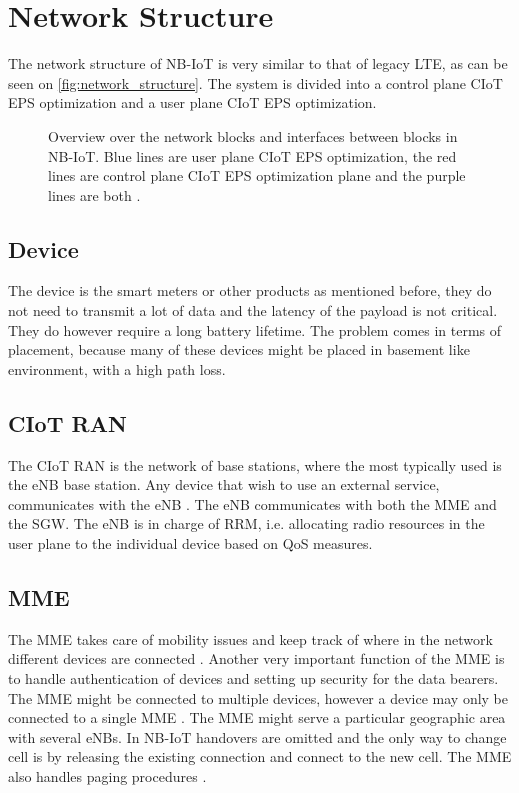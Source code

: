  \section{Network Structure}

The network structure of \gls{NB-IoT} is very similar to that of legacy \gls{LTE}, as can be seen on \autoref{fig:network_structure}. The system is divided into a control plane \gls{CIoT} \gls{EPS} optimization and a user plane \gls{CIoT} \gls{EPS} optimization.

\begin{figure}[H]
\centering

\caption{Overview over the network blocks and interfaces between blocks in \gls{NB-IoT}. Blue lines are user plane \gls{CIoT} \gls{EPS} optimization, the red lines are control plane \gls{CIoT} \gls{EPS} optimization plane and the purple lines are both \citep{NB_slide}.}
\label{fig:network_structure}
\end{figure}


\subsection{Device}
The device is the smart meters or other products as mentioned before, they do not need to transmit a lot of data and the latency of the payload is not critical. They do however require a long battery lifetime. The problem comes in terms of placement, because many of these devices might be placed in basement like environment, with a high path loss. \citep{REL-13,book_LTE_for_UMTS}

\subsection{\gls{CIoT} \gls{RAN}}
The \gls{CIoT} \gls{RAN} is the network of base stations, where the most typically used is the \gls{eNB} base station. Any device that wish to use an external service, communicates with the \gls{eNB} \citep{book_LTE_for_UMTS}. The \gls{eNB} communicates with both the \gls{MME} and the \gls{SGW}. The \gls{eNB} is in charge of \gls{RRM}, i.e. allocating radio resources in the user plane to the individual device based on \gls{QoS} measures. 

\subsection{\gls{MME}}
The \gls{MME} takes care of mobility issues and keep track of where in the network different devices are connected . Another very important function of the \gls{MME} is to handle authentication of devices and setting up security for the data bearers. The \gls{MME} might be connected to multiple devices, however a device may only be connected to a single \gls{MME} \citep[ch. 3]{book_LTE_for_UMTS}. The \gls{MME} might serve a particular geographic area with several \gls{eNB}s. In \gls{NB-IoT} handovers are omitted and the only way to change cell is by releasing the existing connection and connect to the new cell\citep{REL-13}. The \gls{MME} also handles paging procedures \citep{NB-IoT_Book}.


